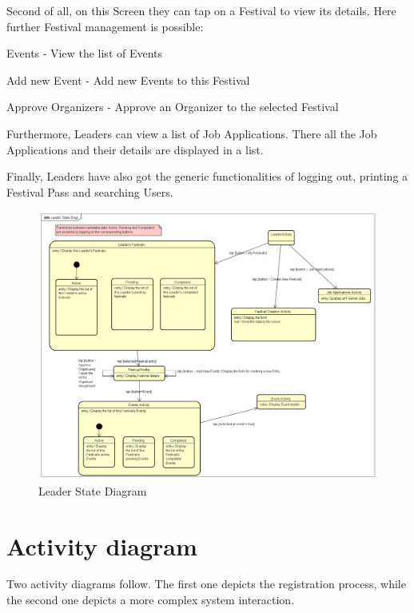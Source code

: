 Second of all, on this Screen they can tap on a Festival to view its details. Here further Festival management is possible:
\begin{packed_enum}
	\item Events - View the list of Events
	\item Add new Event - Add new Events to this Festival
	\item Approve Organizers - Approve an Organizer to the selected Festival
\end{packed_enum}

Furthermore, Leaders can view a list of Job Applications. There all the Job Applications and their details are displayed in a list.

Finally, Leaders have also got the generic functionalities of logging out, printing a Festival Pass and searching Users.

\begin{figure}[H]
	\includegraphics[width=\linewidth]{diagrams/Leader State Diag.png}
	\caption{Leader State Diagram}
	\label{fig:leader_state_diag}
\end{figure}
\eject

\section{Activity diagram}

Two activity diagrams follow. The first one depicts the registration process, while the second one depicts a more complex system interaction.

